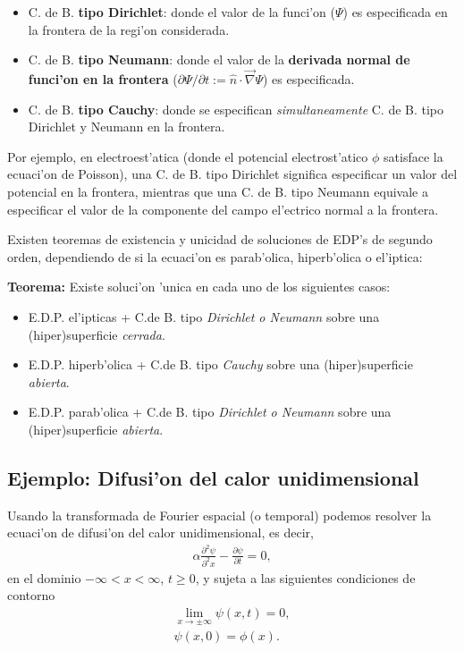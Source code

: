 \begin{itemize}
\item C. de B. \textbf{tipo Dirichlet}: donde el valor de la funci'on ($\Psi$) es especificada en la frontera de la regi'on considerada.
\item C. de B. \textbf{tipo Neumann}: donde el valor de la \textbf{derivada normal de funci'on en la frontera} ($\partial\Psi/\partial t:=\hat{n}\cdot\vec\nabla\Psi$) es especificada.
\item C. de B. \textbf{tipo Cauchy}: donde se especifican \textit{simultaneamente} C. de B. tipo Dirichlet y Neumann en la frontera.
\end{itemize}
Por ejemplo, en electroest'atica (donde el potencial electrost'atico $\phi$ satisface la ecuaci'on de Poisson), una C. de B. tipo Dirichlet significa especificar un valor del potencial en la frontera, mientras que una C. de B. tipo Neumann equivale a especificar el valor de la componente del campo el'ectrico normal a la frontera. 

Existen teoremas de existencia y unicidad de soluciones de EDP's de segundo orden, dependiendo de si la ecuaci'on es parab'olica, hiperb'olica o el'iptica:

\textbf{Teorema:} Existe soluci'on 'unica en cada uno de los siguientes casos:

\begin{itemize}
\item E.D.P. el'ipticas +  C.de B. tipo \textit{Dirichlet o Neumann} sobre una (hiper)superficie \textit{cerrada}.
\item E.D.P. hiperb'olica + C.de B. tipo \textit{Cauchy} sobre una (hiper)superficie \textit{abierta}.
\item E.D.P. parab'olica + C.de B. tipo \textit{Dirichlet o Neumann} sobre una (hiper)superficie \textit{abierta}.
\end{itemize}

\subsection{Ejemplo: Difusi'on del calor unidimensional}

Usando la transformada de Fourier espacial (o temporal) podemos resolver la ecuaci'on de difusi'on del calor unidimensional, es decir,
\begin{align}\label{ec1dej1}
\alpha \frac{\partial^2 \psi}{\partial^2 x}-\frac{\partial \psi}{\partial t}=0,
\end{align}
en el dominio $-\infty<x<\infty$, $t\ge 0$, y sujeta a las siguientes condiciones de contorno
\begin{align}
\lim_{x \rightarrow \pm \infty}\psi(x,t)=0,\label{eq:bc1}\\
\psi(x,0)=\phi(x).\label{eq:bc2}
\end{align}

